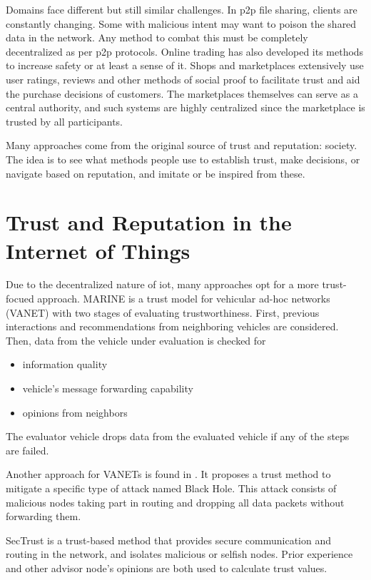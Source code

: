 \documentclass[%
    ]{\PathToTumTemplate/thesis/tum_thesis}
\begin{document}
Domains face different but still similar challenges. In \gls{p2p} file sharing, clients are constantly changing. Some with malicious intent may want to poison the shared data in the network. Any method to combat this must be completely decentralized as per \gls{p2p} protocols. Online trading has also developed its methods to increase safety or at least a sense of it. Shops and marketplaces extensively use user ratings, reviews and other methods of social proof to facilitate trust and aid the purchase decisions of customers. The marketplaces themselves can serve as a central authority, and such systems are highly centralized since the marketplace is trusted by all participants.

Many approaches come from the original source of trust and reputation: society. 
The idea is to see what methods people use to establish trust, make decisions, or navigate based on reputation, and imitate or be inspired from these.


\section{Trust and Reputation in the Internet of Things}

Due to the decentralized nature of \gls{iot}, many approaches opt for a more trust-focued approach.
MARINE is a trust model for vehicular ad-hoc networks (VANET) with two stages of evaluating trustworthiness\cite{ahmad_marine_2020}.
First, previous interactions and recommendations from neighboring vehicles are considered.
Then, data from the vehicle under evaluation is checked for
\begin{itemize}
\item information quality
\item vehicle’s message forwarding capability
\item opinions from neighbors
\end{itemize}
The evaluator vehicle drops data from the evaluated vehicle if any of the steps are failed.

Another approach for VANETs is found in \cite{primiero_simulation_2018}.
It proposes a trust method to mitigate a specific type of attack named Black Hole.
This attack consists of malicious nodes taking part in routing and dropping all data packets without forwarding them.

SecTrust is a trust-based method that provides secure communication and routing in the network, and isolates malicious or selfish nodes\cite{airehrour_trust-based_2017}.
Prior experience and other advisor node's opinions are both used to calculate trust values.
\end{document}
